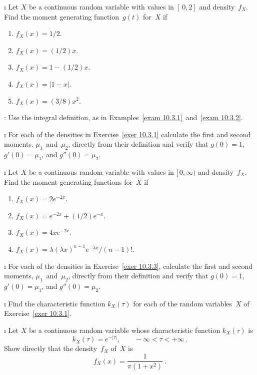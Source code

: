 \exercises
\begin{LJSItem}


\i\label{exer 10.3.1} Let $X$ be a continuous random variable with values in
$[\,0,2]$ and density~$f_X$.  Find the moment generating function~$g(t)$ for~$X$
if
\begin{enumerate}
\item $f_X(x) = 1/2$.

\item $f_X(x) = (1/2)x$.

\item $f_X(x) = 1 - (1/2)x$.

\item $f_X(x) = |1 - x|$.

\item $f_X(x) = (3/8)x^2$.
\end{enumerate}
\noindent {}: Use the integral definition, as in Examples~\ref{exam
10.3.1}~and~\ref{exam 10.3.2}.

\i\label{exer 10.3.2} For each of the densities in Exercise~\ref{exer 10.3.1} calculate 
the first and second moments, $\mu_1$~and~$\mu_2$, directly from their definition and 
verify that $g(0) = 1$, $g'(0) = \mu_1$, and $g''(0) = \mu_2$.

\i\label{exer 10.3.3} Let $X$ be a continuous random variable with values in
$[\,0,\infty)$ and density~$f_X$.  Find the moment generating functions for~$X$
if
\begin{enumerate}
\item $f_X(x) = 2e^{-2x}$.

\item $f_X(x) = e^{-2x} + (1/2)e^{-x}$.

\item $f_X(x) = 4xe^{-2x}$.

\item $f_X(x) = \lambda(\lambda x)^{n - 1} e^{-\lambda x}/(n - 1)!$.
\end{enumerate}

\i\label{exer 10.3.4} For each of the densities in Exercise~\ref{exer 10.3.3}, calculate 
the first and second moments, $\mu_1$~and~$\mu_2$, directly from their definition and verify
that $g(0) = 1$, $g'(0) = \mu_1$, and $g''(0) = \mu_2$.

\i\label{exer 10.3.5} Find the characteristic function $k_X(\tau)$ for each of the random
variables~$X$ of Exercise~\ref{exer 10.3.1}.

\i\label{exer 10.3.6} Let $X$ be a continuous random variable whose characteristic function
$k_X(\tau)$ is
$$
k_X(\tau) = e^{-|\tau|}, \qquad -\infty < \tau < +\infty\ .
$$
Show directly that the density~$f_X$ of~$X$ is
$$
f_X(x) = \frac1{\pi(1 + x^2)}\ .
$$


\end{LJSItem}
